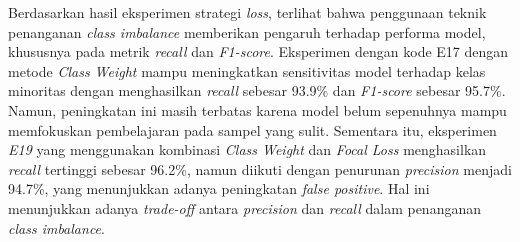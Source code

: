 Berdasarkan hasil eksperimen strategi \textit{loss}, terlihat bahwa penggunaan teknik penanganan \textit{class imbalance} memberikan pengaruh terhadap performa model, khususnya pada metrik \textit{recall} dan \textit{F1-score}. Eksperimen dengan kode E17 dengan metode \textit{Class Weight} mampu meningkatkan sensitivitas model terhadap kelas minoritas dengan menghasilkan \textit{recall} sebesar 93.9\% dan \textit{F1-score} sebesar 95.7\%. Namun, peningkatan ini masih terbatas karena model belum sepenuhnya mampu memfokuskan pembelajaran pada sampel yang sulit. Sementara itu, eksperimen \textit{E19} yang menggunakan kombinasi \textit{Class Weight} dan \textit{Focal Loss} menghasilkan \textit{recall} tertinggi sebesar 96.2\%, namun diikuti dengan penurunan \textit{precision} menjadi 94.7\%, yang menunjukkan adanya peningkatan \textit{false positive}. Hal ini menunjukkan adanya \textit{trade-off} antara \textit{precision} dan \textit{recall} dalam penanganan \textit{class imbalance}.

\begin{table}[H]
    \centering
    \caption{Hasil Eksperimen Model multimodal Strategi Penanganan \textit{Class Imbalance}}
    \label{table:4.multimodal_loss}
    \small
    \setlength{\tabcolsep}{3pt} %
    \renewcommand{\arraystretch}{1.2}
    
\end{table}

